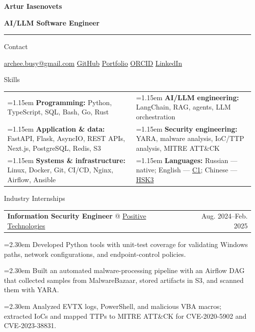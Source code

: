 \documentclass[11pt,a4paper]{article}
\makeatletter
\newcommand{\cvrow}[2]{%
  \noindent
  \begin{minipage}[t]{0.145\textwidth}
    \vspace{0pt}%
    \raggedright
    \fontsize{10.5}{12.5}\selectfont
    #1
  \end{minipage}%
  \hfill
  \begin{minipage}[t]{0.835\textwidth}
    \vspace{0pt}%
    #2
  \end{minipage}\par
}
\newcommand{\skillcell}[2]{%
  \noindent
  \hangindent=1.15em
  \hangafter=1
  \makebox[1.15em][l]{$\diamond$}%
  \textbf{#1} #2%
}
\newcommand{\workentry}[2]{%
  \noindent
  \begin{tabularx}{\linewidth}
    {@{}X@{\hspace{0.8em}}r@{}}
    #1 & \small #2
  \end{tabularx}\par
  \vspace{0.15em}
}
\newcommand{\workproject}[1]{%
  \noindent
  \hangindent=2.30em
  \hangafter=1
  \hspace*{1.15em}\makebox[1.15em][l]{$\diamond$}#1\par
  \vspace{0.12em}
}
\makeatother
\begin{document}
{\fontsize{24}{28}\selectfont\bfseries Artur Iasenovets}\par
\vspace{0.08em}
{\large\bfseries AI/LLM Software Engineer}\par
\vspace{0.22em}
\hrule
\vspace{0.55em}

\cvrow{Contact}{%
  \href{mailto:archee.busy@gmail.com}{archee.busy@gmail.com}
  \;\textbullet\;
  \href{https://github.com/iasenovets}{GitHub}
  \;\textbullet\;
  \href{https://iasenovets.github.io/}{Portfolio}
  \;\textbullet\;
  \href{https://orcid.org/0009-0008-0008-3746}{ORCID}
  \;\textbullet\;
  \href{https://linkedin.com/in/iasenovets}{LinkedIn}
}

\vspace{0.55em}

\cvrow{Skills}{%
  \begin{tabularx}{\linewidth}
    {@{}>{\raggedright\arraybackslash}X
    @{\hspace{1.2em}}
    >{\raggedright\arraybackslash}X@{}}

    \skillcell{Programming:}{%
      Python, TypeScript, SQL, Bash, Go, Rust}
    &
    \skillcell{AI/LLM engineering:}{%
      LangChain, RAG, agents,
      LLM orchestration}
    \\[0.20em]

    \skillcell{Application \& data:}{%
      FastAPI, Flask, AsyncIO, REST APIs,
      Next.js, PostgreSQL, Redis, S3}
    &
    \skillcell{Security engineering:}{%
      YARA, malware analysis, IoC/TTP analysis,
      MITRE ATT\&CK}
    \\[0.20em]

    \skillcell{Systems \& infrastructure:}{%
      Linux, Docker, Git, CI/CD, Nginx,
      Airflow, Ansible}
    &
    \skillcell{Languages:}{%
      Russian --- native;
      English --- \href{https://iasenovets.github.io/files/toefl_8cd5f4a2b8ec8f34da49ea0faeef43f1.pdf}{C1};
      Chinese --- \href{https://admin.chinesetest.cn/queryScore.do?sid=c2tActR9Wb\%2704b861aefbdc5e9fd0b44afa717d08cbceb0720e582ce25f\%2724d7sWsQ5nVUQSwD}{HSK3}}
  \end{tabularx}
}

\vspace{0.75em}

\cvrow{Industry Internships}{%
  \workentry
    {\textbf{Information Security Engineer} @
    \href{https://global.ptsecurity.com/en/}{Positive Technologies}}
    {Aug. 2024--Feb. 2025}

  \workproject{Developed Python tools with unit-test coverage for validating
  Windows paths, network configurations, and endpoint-control policies.}
  \workproject{Built an automated malware-processing pipeline with an Airflow DAG
  that collected samples from MalwareBazaar, stored artifacts in S3, and scanned
  them with YARA.}
  \workproject{Analyzed EVTX logs, PowerShell, and malicious VBA macros; extracted
  IoCs and mapped TTPs to MITRE ATT\&CK for CVE-2020-5902 and CVE-2023-38831.}
}
\end{document}
